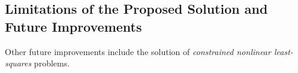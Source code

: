 


%
\subsection{Limitations of the Proposed Solution and Future Improvements}
Other future improvements include the solution of \textit{constrained nonlinear least-squares }problems.

